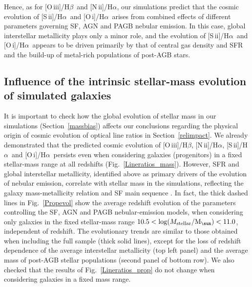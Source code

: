 \documentclass[fleqn,usenatbib]{mnras}
\newcommand{\Msun}{\hbox{M$_\sun$}}
\newcommand{\oiiihb}{\hbox{[O\,{\sc iii}]/H$\beta$}}
\newcommand{\niiha}{\hbox{[N\,{\sc ii}]/H$\alpha$}}
\newcommand{\siiha}{\hbox{[S\,{\sc ii}]/H$\alpha$}}
\newcommand{\oiha}{\hbox{[O\,{\sc i}]/H$\alpha$}}
\begin{document}
Hence, as for \oiiihb\ and \niiha, our simulations predict that the
cosmic  evolution of \siiha\ and \oiha\ arises from combined effects
of different  parameters governing SF, AGN and PAGB nebular
emission. In this case, global interstellar metallicity plays only a
minor role, and the evolution of \siiha\  and \oiha\ appears to be
driven primarily by that of central gas density and SFR and the
build-up of metal-rich populations of post-AGB stars. 





\subsection{Influence of the intrinsic stellar-mass evolution of simulated galaxies}\label{massbias_origin}

It is important to check how the global evolution of stellar mass 
in our simulations (Section~\ref{massbias}) affects our conclusions 
regarding the physical origin of cosmic evolution of optical line
ratios in Section~\ref{relimpact}. We already demonstrated that the
predicted cosmic  evolution of \oiiihb, \niiha, \siiha\ and \oiha\
persists even when considering  galaxies (progenitors) in a fixed
stellar-mass range at all redshifts
(Fig.~\ref{Lineratios_mass}). However, SFR and global interstellar
metallicity, identified  above as primary drivers of the evolution of
nebular emission, correlate with stellar  mass in the simulations,
reflecting the galaxy mass-metallicity relation and SF main sequence
\citep[see the model predictions by][]{Hirschmann13, Hirschmann16}. In
fact, the thick dashed lines in Fig.~\ref{Propevol} show the average
redshift  evolution of the parameters controlling the SF, AGN and PAGB
nebular-emission models, when considering only galaxies in the fixed
stellar-mass range $10.5<\log (M_{\rm stellar}/\Msun)<11.0$,
independent of redshift. The evolutionary trends are similar to those
obtained when including the full  sample (thick solid lines), except
for the loss of redshift dependence of the average interstellar
metallicity (top left panel) and the average mass of post-AGB
stellar populations (second panel of bottom row). We also checked that
the results of Fig.~\ref{Lineratios_prop} do not change when
considering galaxies in a fixed mass range.
\end{document}
